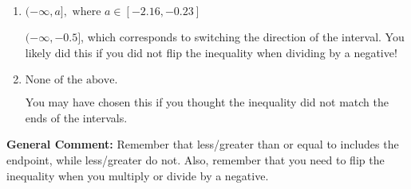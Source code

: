 \documentclass{extbook}[14pt]
\begin{document}
\begin{enumerate}
{\begin{enumerate}[label=\Alph*.]
 $[0.5, \infty)$, which corresponds to negating the endpoint of the solution.
\item \( (-\infty, a], \text{ where } a \in [-2.16, -0.23] \)

 $(-\infty, -0.5]$, which corresponds to switching the direction of the interval. You likely did this if you did not flip the inequality when dividing by a negative!
\item \( \text{None of the above}. \)

You may have chosen this if you thought the inequality did not match the ends of the intervals.
\end{enumerate}

\textbf{General Comment:} Remember that less/greater than or equal to includes the endpoint, while less/greater do not. Also, remember that you need to flip the inequality when you multiply or divide by a negative.
}
\end{enumerate}
\end{document}
